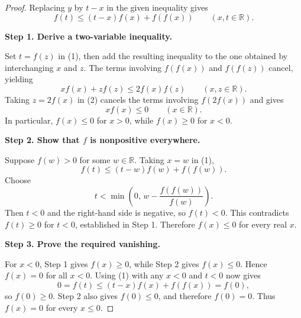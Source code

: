 
\begin{dlsummary}[title={\bfseries Solution 27. IMO 2011 -- Problem 3},breakable]

\begin{proof}
Replacing $y$ by $t-x$ in the given inequality gives
\[
f(t)\leq(t-x)f(x)+f(f(x))\qquad(x,t\in\mathbb R). \tag{1}
\]

\medskip
\noindent
\textbf{Step 1. Derive a two-variable inequality.}

Set $t=f(z)$ in (1), then add the resulting inequality to the one
obtained by interchanging $x$ and $z$. The terms involving $f(f(x))$
and $f(f(z))$ cancel, yielding
\[
xf(x)+zf(z)\leq2f(x)f(z)\qquad(x,z\in\mathbb R). \tag{2}
\]
Taking $z=2f(x)$ in (2) cancels the terms involving
$f(2f(x))$ and gives
\[
xf(x)\leq0\qquad(x\in\mathbb R). \tag{3}
\]
In particular, $f(x)\leq0$ for $x>0$, while $f(x)\geq0$ for $x<0$.

\medskip
\noindent
\textbf{Step 2. Show that $f$ is nonpositive everywhere.}

Suppose $f(w)>0$ for some $w\in\mathbb R$. Taking $x=w$ in (1),
\[
f(t)\leq(t-w)f(w)+f(f(w)).
\]
Choose
\[
t<\min\!\left(0,\,w-\frac{f(f(w))}{f(w)}\right).
\]
Then $t<0$ and the right-hand side is negative, so $f(t)<0$.
This contradicts $f(t)\geq0$ for $t<0$, established in Step 1.
Therefore $f(x)\leq0$ for every real $x$.

\medskip
\noindent
\textbf{Step 3. Prove the required vanishing.}

For $x<0$, Step 1 gives $f(x)\geq0$, while Step 2 gives
$f(x)\leq0$. Hence $f(x)=0$ for all $x<0$. Using (1) with any
$x<0$ and $t<0$ now gives
\[
0=f(t)\leq(t-x)f(x)+f(f(x))=f(0),
\]
so $f(0)\geq0$. Step 2 also gives $f(0)\leq0$, and therefore
$f(0)=0$. Thus $f(x)=0$ for every $x\leq0$.
\end{proof}

\end{dlsummary}
